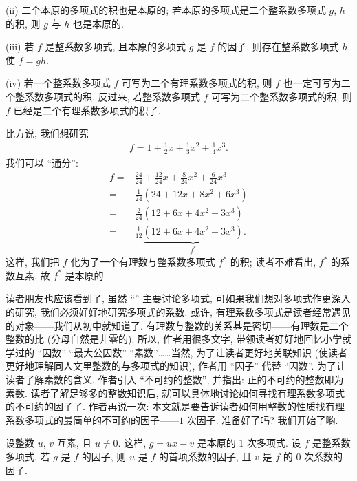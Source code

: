 (ii) 二个本原的多项式的积也是本原的; 若本原的多项式是二个整系数多项式 $g$, $h$ 的积, 则 $g$ 与 $h$ 也是本原的.

(iii) 若 $f$ 是整系数多项式, 且本原的多项式 $g$ 是 $f$ 的因子, 则存在整系数多项式 $h$ 使 $f = gh$.

(iv) 若一个整系数多项式 $f$ 可写为二个有理系数多项式的积, 则 $f$ 也一定可写为二个整系数多项式的积. 反过来, 若整系数多项式 $f$ 可写为二个整系数多项式的积, 则 $f$ 已经是二个有理系数多项式的积了.

比方说, 我们想研究
\begin{align*}
    f = 1 + \frac{1}{2}x + \frac{1}{3}x^2 + \frac{1}{4}x^3.
\end{align*}
我们可以 ``通分'':
\begin{align*}
    f
    = {} & \frac{24}{24} + \frac{12}{24} x + \frac{8}{24} x^2 + \frac{6}{24} x^3 \\
    = {} & \frac{1}{24} (24 + 12x + 8x^2 + 6x^3)                                 \\
    = {} & \frac{2}{24} (12 + 6x + 4x^2 + 3x^3)                                  \\
    = {} & \frac{1}{12} \underbrace{(12 + 6x + 4x^2 + 3x^3)}_{f^{\ast}}.
\end{align*}
这样, 我们把 $f$ 化为了一个有理数与整系数多项式 $f^{\ast}$ 的积; 读者不难看出, $f^{\ast}$ 的系数互素, 故 $f^{\ast}$ 是本原的.

读者朋友也应该看到了, 虽然 ``\HEADING '' 主要讨论多项式, 可如果我们想对多项式作更深入的研究, 我们必须好好地研究多项式的系数. 或许, 有理系数多项式是读者经常遇见的对象——我们从初中就知道了. 有理数与整数的关系甚是密切——有理数是二个整数的比 (分母自然是非零的). 所以, 作者用很多文字, 带领读者好好地回忆小学就学过的 ``因数'' ``最大公因数'' ``素数''……当然, 为了让读者更好地关联知识 (使读者更好地理解同人文里整数的与多项式的知识), 作者用 ``因子'' 代替 ``因数''. 为了让读者了解素数的含义, 作者引入 ``不可约的整数'', 并指出: 正的不可约的整数即为素数. 读者了解足够多的整数知识后, 就可以具体地讨论如何寻找有理系数多项式的不可约的因子了. 作者再说一次: 本文就是要告诉读者如何用整数的性质找有理系数多项式的最简单的不可约的因子——$1$ 次因子. 准备好了吗? 我们开始了哟.

\begin{proposition}
    设整数 $u$, $v$ 互素, 且 $u \neq 0$. 这样, $g = ux - v$ 是本原的 $1$ 次多项式. 设 $f$ 是整系数多项式. 若 $g$ 是 $f$ 的因子, 则 $u$ 是 $f$ 的首项系数的因子, 且 $v$ 是 $f$ 的 $0$ 次系数的因子.
\end{proposition}

